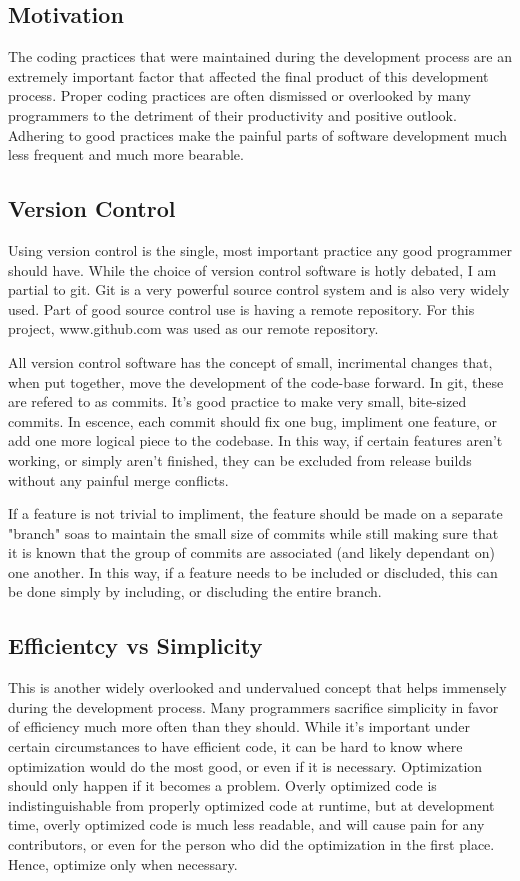 \documentclass[se]{uw-wkrpt}
\begin{document}
\subsection{Motivation}

The coding practices that were maintained 
during the development process are an extremely
important factor that affected the final product of this development
process. Proper coding 
practices are often dismissed or overlooked by many programmers to
the detriment of their productivity and positive outlook. Adhering to 
good practices make the painful parts of software development much less
frequent and much more bearable.

\subsection{Version Control}

Using version control is the single, most important practice any
good programmer should have. While the choice of version control 
software is hotly debated, I am partial to git. Git is a very
powerful source control system and is also very widely used.
Part of good source control use is having a remote repository.
For this project, www.github.com was used as our remote repository.

All version control software has the concept of small, incrimental
changes that, when put together, move the development of the code-base
forward. In git, these are refered to as commits. It's good practice
to make very small, bite-sized commits. In escence, each commit should
fix one bug, impliment one feature, or add one more logical piece to
the codebase. In this way, if certain features aren't working, or simply
aren't finished, they can be excluded from release builds without any
painful merge conflicts.

If a feature is not trivial to impliment, the feature should be
made on a separate "branch" soas to maintain the small size of commits
while still making sure that it is known that the group of commits are 
associated (and likely dependant on) one another. In this way, if a feature
needs to be included or discluded, this can be done simply by including, or 
discluding the entire branch.

\subsection{Efficientcy vs Simplicity}

This is another widely overlooked and undervalued concept that 
helps immensely during the development process. Many programmers
sacrifice simplicity in favor of efficiency much more often than
they should. While it's important under certain circumstances to
have efficient code, it can be hard to know where optimization would
do the most good, or even if it is necessary. Optimization should
only happen if it becomes a problem. Overly optimized code is indistinguishable
from properly optimized code at runtime, but at development time, 
overly optimized code is much less readable, and will cause pain
for any contributors, or even for the person who did the optimization
in the first place. Hence, optimize only when necessary.
\end{document}
